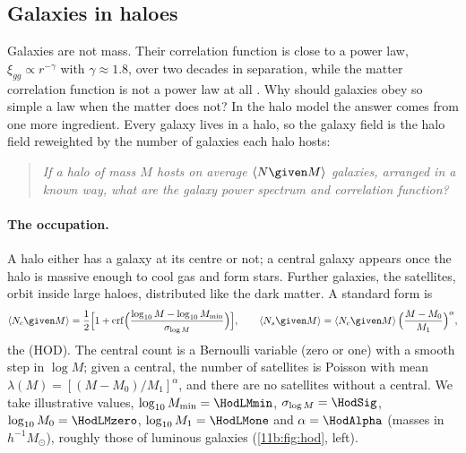 \subsection{Galaxies in haloes}
\label{11b:sec:hod}

Galaxies are not mass. Their correlation function is close to a power law,
$\xi_{gg}\propto r^{-\gamma}$ with $\gamma\approx1.8$, over two decades in
separation, while the matter correlation function is not a power law at all
. Why should galaxies obey so simple a law when the
matter does not? In the halo model the answer comes from one more ingredient. Every
galaxy lives in a halo, so the galaxy field is the halo field reweighted by the
number of galaxies each halo hosts:
\begin{quote}
\emph{If a halo of mass $M$ hosts on average $\langle N\given M\rangle$ galaxies,
arranged in a known way, what are the galaxy power spectrum and correlation
function?}
\end{quote}

\paragraph{The occupation.}
A halo either has a galaxy at its centre or not; a central galaxy appears once the
halo is massive enough to cool gas and form stars. Further galaxies, the
satellites, orbit inside large haloes, distributed like the dark matter. A
standard form \cite{Zheng2005} is
\begin{equation}
  \langle N_c\given M\rangle=\frac12\Bigl[1+\operatorname{erf}
    \Bigl(\frac{\log_{10}M-\log_{10}M_{\min}}{\sigma_{\log M}}\Bigr)\Bigr],
  \qquad
  \langle N_s\given M\rangle=\langle N_c\given M\rangle\,
     \Bigl(\frac{M-M_0}{M_1}\Bigr)^{\alpha},
  \label{11b:eq:hod}
\end{equation}
the  (HOD). The central count is a Bernoulli
variable (zero or one) with a smooth step in $\log M$; given a central, the number
of satellites is Poisson with mean $\lambda(M)=[(M-M_0)/M_1]^\alpha$, and there are
no satellites without a central. We take illustrative values,
$\log_{10}M_{\min}=\HodLMmin$, $\sigma_{\log M}=\HodSig$,
$\log_{10}M_0=\HodLMzero$, $\log_{10}M_1=\HodLMone$ and $\alpha=\HodAlpha$ (masses
in $h^{-1}M_\odot$), roughly those of luminous galaxies
(\cref{11b:fig:hod}, left).

